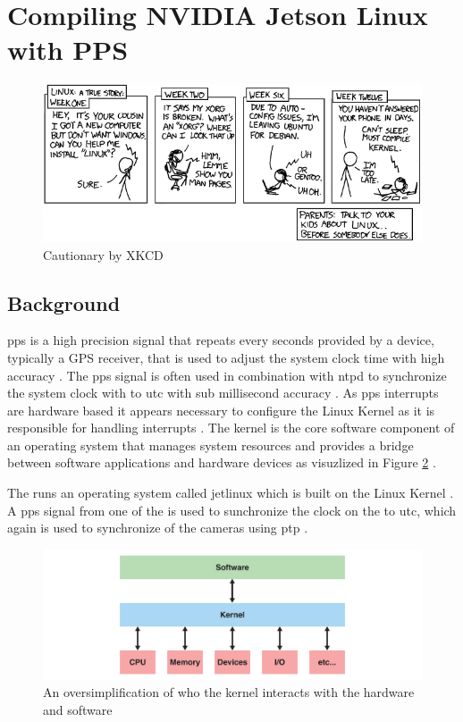

\section{Compiling NVIDIA Jetson Linux with PPS}
\begin{figure}[H]
    \centering
    \includegraphics[width=\textwidth]{figures/cautionary.png}
    \caption{Cautionary by XKCD \cite{xkcdCautionary}}
    \label{fig:xkcd_cautionary}
\end{figure}
\subsection{Background}
\gls{pps} is a high precision signal that repeats every seconds provided by a device, typically a GPS receiver, that is used to adjust the system clock time with high accuracy \cite{giomettiLinuxPPSWikiLinuxPPS2007}.
The \gls{pps} signal is often used in combination with \gls{ntpd} to synchronize the system clock with to \gls{utc} with sub millisecond accuracy \cite{giomettiLinuxPPSWikiLinuxPPS2007}.
As \gls{pps} interrupts are hardware based it appears necessary to configure the Linux Kernel as it is responsible for handling interrupts \cite{giomettiLinuxPPSWikiLinuxPPS2007}.
The kernel is the core software component of an operating system that manages system resources and provides a bridge between software applications and hardware devices as visuzlized in Figure \ref{fig:kernel_visualization} \cite{thekerneldevelopmentcommunityInterruptsLinuxKernel}.


The \jx runs an operating system called \gls{jetlinux} which is built on the Linux Kernel \cite{JetsonLinux352023}.
A \gls{pps} signal from one of the  is used to sunchronize the clock on the \sr to \gls{utc}, which again is used to synchronize of the cameras using \gls{ptp} \cite{martensPortableSensorRig2022}.

\begin{figure}[H]
    \centering
    \includegraphics[width=\textwidth]{figures/kernel.pdf}
    \caption{An oversimplification of who the kernel interacts with the hardware and software}
    \label{fig:kernel_visualization}
\end{figure}

